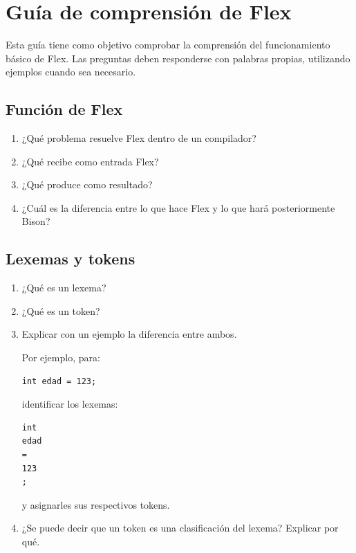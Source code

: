 \documentclass{article}
\begin{document}
\section{Guía de comprensión de Flex}

Esta guía tiene como objetivo comprobar la comprensión del funcionamiento
básico de Flex. Las preguntas deben responderse con palabras propias,
utilizando ejemplos cuando sea necesario.

\subsection{Función de Flex}

\begin{enumerate}
    \item ¿Qué problema resuelve Flex dentro de un compilador?

    \item ¿Qué recibe como entrada Flex?

    \item ¿Qué produce como resultado?

    \item ¿Cuál es la diferencia entre lo que hace Flex y lo que hará
    posteriormente Bison?
\end{enumerate}

\subsection{Lexemas y tokens}

\begin{enumerate}
    \item ¿Qué es un lexema?

    \item ¿Qué es un token?

    \item Explicar con un ejemplo la diferencia entre ambos.

    Por ejemplo, para:

\begin{verbatim}
int edad = 123;
\end{verbatim}

    identificar los lexemas:

\begin{verbatim}
int
edad
=
123
;
\end{verbatim}

    y asignarles sus respectivos tokens.

    \item ¿Se puede decir que un token es una clasificación del lexema?
    Explicar por qué.
\end{enumerate}
\end{document}
